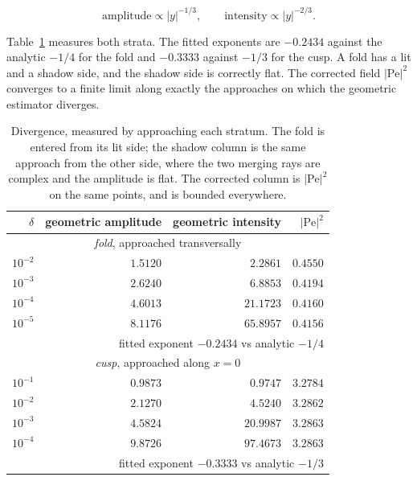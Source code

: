 \begin{equation}
\text{amplitude}\propto|y|^{-1/3},
\qquad
\text{intensity}\propto|y|^{-2/3}.
\label{eq:cusp-scaling}
\end{equation}

Table~\ref{tab:cusp} measures both strata. The fitted exponents are $-0.2434$
against the analytic $-1/4$ for the fold and $-0.3333$ against $-1/3$ for the
cusp. A fold has a lit and a shadow side, and the shadow side is correctly flat.
The corrected field $|\mathrm{Pe}|^2$ converges to a finite limit along exactly the
approaches on which the geometric estimator diverges.

\begin{table}[tbp]
\centering
\caption{Divergence, measured by approaching each stratum. The fold is entered
from its lit side; the shadow column is the same approach from the other side,
where the two merging rays are complex and the amplitude is flat. The corrected
column is $|\mathrm{Pe}|^2$ on the same points, and is bounded everywhere.}
\label{tab:cusp}
\footnotesize
\begin{tabular}{rrrr}
\hline
$\delta$ & geometric amplitude & geometric intensity & $|\mathrm{Pe}|^2$ \\
\hline
\multicolumn{4}{c}{\emph{fold}, approached transversally} \\
$10^{-2}$ & $1.5120$ & $2.2861$ & $0.4550$ \\
$10^{-3}$ & $2.6240$ & $6.8853$ & $0.4194$ \\
$10^{-4}$ & $4.6013$ & $21.1723$ & $0.4160$ \\
$10^{-5}$ & $8.1176$ & $65.8957$ & $0.4156$ \\
 & \multicolumn{3}{r}{fitted exponent $-0.2434$ vs analytic $-1/4$} \\
\hline
\multicolumn{4}{c}{\emph{cusp}, approached along $x=0$} \\
$10^{-1}$ & $0.9873$ & $0.9747$ & $3.2784$ \\
$10^{-2}$ & $2.1270$ & $4.5240$ & $3.2862$ \\
$10^{-3}$ & $4.5824$ & $20.9987$ & $3.2863$ \\
$10^{-4}$ & $9.8726$ & $97.4673$ & $3.2863$ \\
 & \multicolumn{3}{r}{fitted exponent $-0.3333$ vs analytic $-1/3$} \\
\hline
\end{tabular}
\end{table}

